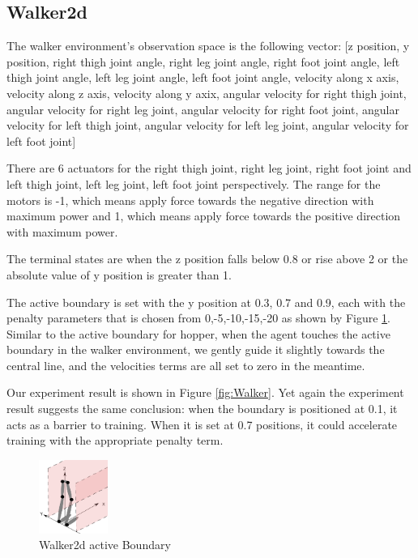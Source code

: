 \documentclass[journal]{IEEEtran}
\begin{document}
\subsection{Walker2d}
The walker environment's observation space is the following vector: [z position, y position, right thigh joint angle, right leg joint angle, right foot joint angle, left thigh joint angle, left leg joint angle, left foot joint angle, velocity along x axis, velocity along z axis, velocity along y axix, angular velocity for right thigh joint, angular velocity for right leg joint, angular velocity for right foot joint, angular velocity for left thigh joint, angular velocity for left leg joint, angular velocity for left foot joint]

There are 6 actuators for the right thigh joint, right leg joint, right foot joint and left thigh joint, left leg joint, left foot joint perspectively. The range for the motors is -1, which means apply force towards the negative direction with maximum power and 1, which means apply force towards the positive direction with maximum power.

The terminal states are when the z position falls below 0.8 or rise above 2 or the absolute value of y position is greater than 1.

The active boundary is set with the y position at 0.3, 0.7 and 0.9, each with the penalty parameters that is chosen from 0,-5,-10,-15,-20 as shown by Figure \ref{fig:walkerPB}. Similar to the active boundary for hopper, when the agent touches the active boundary in the walker environment, we gently guide it slightly towards the central line, and the velocities terms are all set to zero in the meantime.

Our experiment result is shown in Figure \ref{fig:Walker}. Yet again the experiment result suggests the same conclusion: when the boundary is positioned at 0.1, it acts as a barrier to training. When it is set at 0.7 positions, it could accelerate training with the appropriate penalty term.

\begin{figure}
     \centering
      \includegraphics[width=0.2\textwidth]{walker.png}
      \caption{Walker2d active Boundary}
      \label{fig:walkerPB}
\end{figure}
\end{document}
